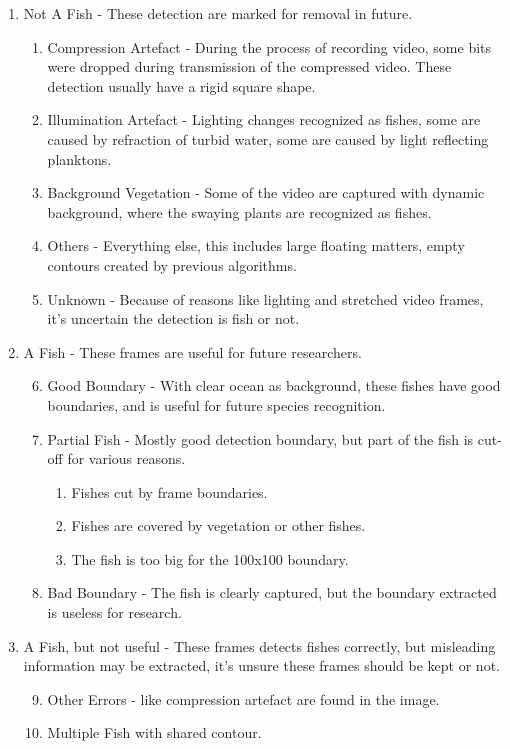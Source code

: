 \documentclass[bsc,logo,twoside,fullspacing,parskip]{infthesis}
\begin{document}
\renewcommand{\labelenumi}{\Roman{enumi}}
\renewcommand{\labelenumii}{\arabic{enumii}}
\renewcommand{\labelenumiii}{\roman{enumiii}}
\begin{enumerate}
 \item Not A Fish - These detection are marked for removal in future.
 \begin{enumerate}
   \item Compression Artefact - During the process of recording video, some bits were dropped during transmission of the compressed video. These detection usually have a rigid square shape.
   \item Illumination Artefact - Lighting changes recognized as fishes, some are caused by refraction of turbid water, some are caused by light reflecting planktons.
   \item Background Vegetation - Some of the video are captured with dynamic background, where the swaying plants are recognized as fishes.
   \item Others - Everything else, this includes large floating matters, empty contours created by previous algorithms.
   \item Unknown - Because of reasons like lighting and stretched video frames, it's uncertain the detection is fish or not.
 \end{enumerate}
 
 \item A Fish - These frames are useful for future researchers.
 \begin{enumerate}
   \setcounter{enumii}{5} 
   \item Good Boundary - With clear ocean as background, these fishes have good boundaries, and is useful for future species recognition.
   \item Partial Fish - Mostly good detection boundary, but part of the fish is cut-off for various reasons.
    \begin{enumerate}
      \item Fishes cut by frame boundaries.
      \item Fishes are covered by vegetation or other fishes.
      \item The fish is too big for the 100x100 boundary.
    \end{enumerate}
   \item Bad Boundary - The fish is clearly captured, but the boundary extracted is useless for research. 
 \end{enumerate}
 
 \item A Fish, but not useful - These frames detects fishes correctly, but misleading information may be extracted, it's unsure these frames should be kept or not.
 \begin{enumerate}
   \setcounter{enumii}{8} 
   \item Other Errors - like compression artefact are found in the image.
   \item Multiple Fish with shared contour.
 \end{enumerate}
\end{enumerate}
\end{document}
